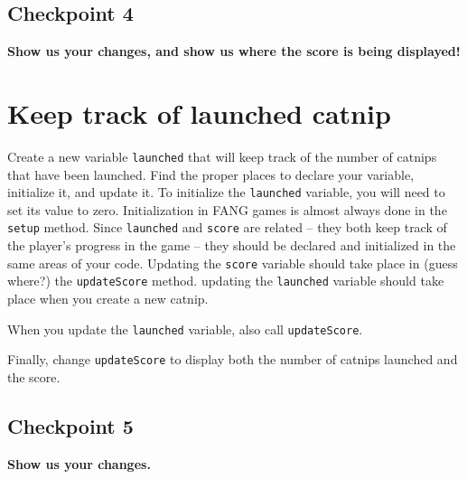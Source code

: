 \documentclass[12pt]{article}
\newcommand{\code}[1]{\texttt{#1}}
\begin{document}
\subsection*{Checkpoint 4}
{\bf Show us your changes, and show us where the score is being displayed!}

\section*{Keep track of launched catnip}
Create a new variable \code{launched} that
will keep track of the number of catnips that have been launched.
Find the proper places to declare your variable,
initialize it,
and update it.
To initialize the \code{launched} variable, you will need to set its value to zero.
Initialization in FANG games is almost always done in the \code{setup} method.
Since \code{launched} and \code{score} are related --
they both keep track of the player's progress in the game --
they should be declared and initialized in the same areas of your code.
Updating the \code{score} variable should take place
in (guess where?) the \code{updateScore} method.
updating the \code{launched} variable should take place
when you create a new catnip.

When you update the \code{launched} variable,  
also call \code{updateScore}.

Finally, change \code{updateScore}
to display both the number of catnips launched and the score.

\subsection*{Checkpoint 5}
{\bf Show us your changes.}
\end{document}
